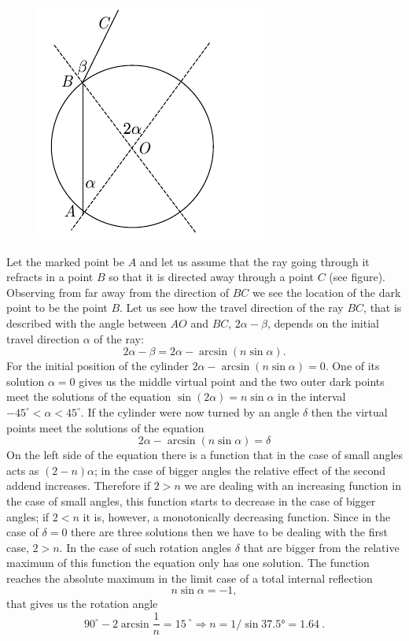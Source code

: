 \documentclass[11pt]{article}
\begin{document}
\solueng
\begin{figure}%
\includegraphics[trim = 0mm 0mm 12mm 0mm, clip, width=1\linewidth]{2014-v3g-10-silinder}
\end{figure}
Let the marked point be $A$ and let us assume that the ray going through it refracts in a point $B$ so that it is directed away through a point $C$ (see figure). Observing from far away from the direction of $BC$ we see the location of the dark point to be the point $B$. Let us see how the travel direction of the ray $BC$, that is described with the angle between $AO$ and $BC$, $2\alpha-\beta$, depends on the initial travel direction $\alpha$ of the ray:
$$2\alpha-\beta= 2\alpha-\arcsin (n\sin\alpha).$$
For the initial position of the cylinder $2\alpha-\arcsin (n\sin\alpha) =0$. One of its solution $\alpha=0$ gives us the middle virtual point and the two outer dark points meet the solutions of the equation $\sin(2\alpha)=n\sin\alpha$ in the interval $-45^\circ <\alpha<45^\circ$. If the cylinder were now turned by an angle $\delta$ then the virtual points meet the solutions of the equation
$$2\alpha-\arcsin (n\sin\alpha) =\delta$$
On the left side of the equation there is a function that in the case of small angles acts as $(2-n)\alpha$; in the case of bigger angles the relative effect of the second addend increases. Therefore if $2>n$ we are dealing with an increasing function in the case of small angles, this function starts to decrease in the case of bigger angles; if $2<n$ it is, however, a monotonically decreasing function. Since in the case of $\delta=0$ there are three solutions then we have to be dealing with the first case, $2>n$. In the case of such rotation angles $\delta$ that are bigger from the relative maximum of this function the equation only has one solution. The function reaches the absolute maximum in the limit case of a total internal reflection
$$n\sin\alpha=-1,$$
that gives us the rotation angle 
$$90^\circ-2\arcsin \frac 1n=\SI{15}{}^\circ\Rightarrow n=1/\sin \ang{37,5} = \SI{1,64}{}.$$
\probend
\bigskip
\end{document}
